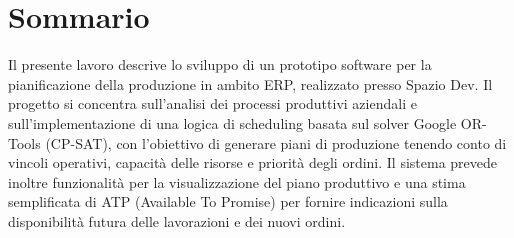 \cleardoublepage
{}
{}
\begingroup
\let\clearpage\relax
\let\cleardoublepage\relax
\chapter*{Sommario}

Il presente lavoro descrive lo sviluppo di un prototipo software per la pianificazione della produzione in ambito ERP, realizzato presso Spazio Dev. Il progetto si concentra sull'analisi dei processi produttivi aziendali e sull'implementazione di una logica di scheduling basata sul solver Google OR-Tools (CP-SAT), con l'obiettivo di generare piani di produzione tenendo conto di vincoli operativi, capacità delle risorse e priorità degli ordini. Il sistema prevede inoltre funzionalità per la visualizzazione del piano produttivo e una stima semplificata di ATP (Available To Promise) per fornire indicazioni sulla disponibilità futura delle lavorazioni e dei nuovi ordini.
\endgroup
\vfill
